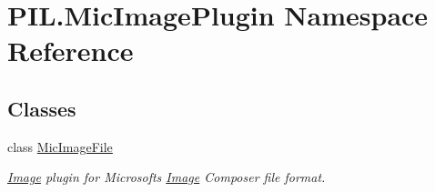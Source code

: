 \hypertarget{namespacePIL_1_1MicImagePlugin}{}\section{P\+I\+L.\+Mic\+Image\+Plugin Namespace Reference}
\label{namespacePIL_1_1MicImagePlugin}
\subsection*{Classes}
\begin{DoxyCompactItemize}
\item 
class \hyperlink{classPIL_1_1MicImagePlugin_1_1MicImageFile}{Mic\+Image\+File}
\begin{DoxyCompactList}\small\item\em \hyperlink{namespacePIL_1_1Image}{Image} plugin for Microsoft\textquotesingle{}s \hyperlink{namespacePIL_1_1Image}{Image} Composer file format. \end{DoxyCompactList}\end{DoxyCompactItemize}
